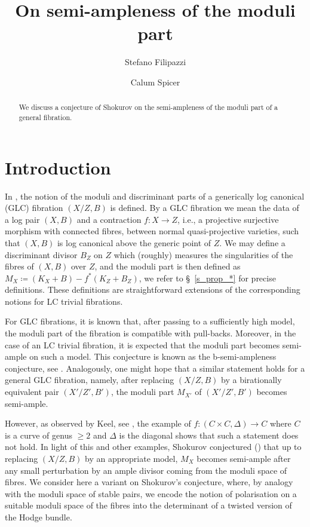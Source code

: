 \documentclass[12pt]{amsart}
\title{On semi-ampleness of the moduli part}
\author[S.~Filipazzi]{Stefano Filipazzi}
\author[C. ~Spicer]{Calum Spicer}
\theoremstyle{plain}
\theoremstyle{definition}
\begin{document}
\begin{abstract}We discuss a conjecture of Shokurov on the semi-ampleness of 
the moduli part of a general fibration.
\end{abstract}

\maketitle
\tableofcontents


\section{Introduction}

In \cite{shokurov2021log}, %
the notion of the moduli and discriminant parts
of a generically log canonical (GLC) fibration $(X/Z, B)$ is defined.
By a GLC fibration we mean the data of a log pair $(X, B)$
and a contraction $f\colon X \rightarrow Z$, i.e., a projective
 surjective morphism with connected fibres,
between normal quasi-projective varieties, such that $(X, B)$ is log canonical above the generic point of $Z$.
We may define a discriminant divisor $B_Z$ on $Z$ which (roughly) measures the singularities of the fibres of $(X, B)$
over $Z$, and the moduli part is then defined as $M_X \coloneqq (K_X+B) - f^*(K_Z+B_Z)$, we refer to \S~\ref{s_prop_*} for precise definitions.
These definitions are straightforward extensions
of the corresponding notions for LC trivial fibrations. 

For GLC fibrations, it is known that, after passing to a sufficiently high model, the moduli part
of the fibration is compatible with pull-backs.  Moreover, in the case of an LC trivial fibration,  
it is expected that the moduli part becomes semi-ample on such a model.
This conjecture is known as the b-semi-ampleness conjecture, see \cite[Conjecture 7.13.1]{ps09}.
Analogously, one might hope that a similar statement holds for a general GLC fibration, namely, 
after replacing $(X/Z, B)$ by a birationally equivalent pair $(X'/Z', B')$,
the moduli part $M_{X'}$ of $(X'/Z', B')$ becomes semi-ample.

However, as observed by Keel, see \cite[\S~5.4]{ACSS}, the example of $f\colon (C \times C, \Delta) \rightarrow C$
where $C$ is a curve of genus $\geq 2$ and $\Delta$ is the diagonal shows that such a statement does not hold.
In light of this and other examples, Shokurov conjectured (\cite[Conjecture 1]{shokurov2021log})
that up to replacing $(X/Z, B)$ by an appropriate model,
$M_X$ becomes semi-ample after any small perturbation 
by an ample divisor coming from the moduli space of fibres.
We consider here a variant on Shokurov's conjecture, where, by analogy with the moduli space of stable pairs, we encode the notion of polarisation on a suitable moduli space of the fibres into the determinant of a twisted version of the Hodge bundle.
\end{document}
